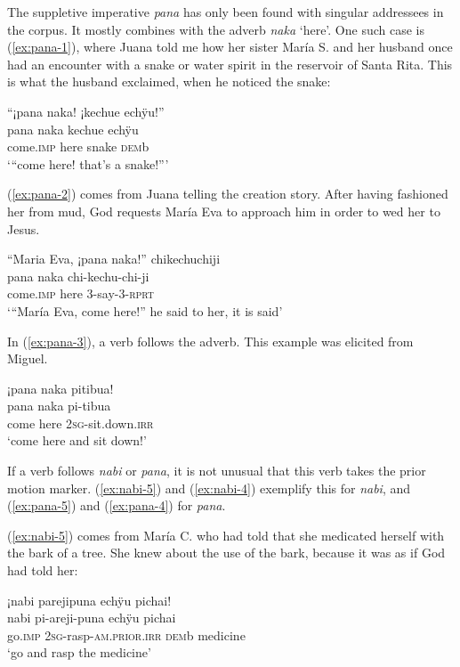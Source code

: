 The suppletive imperative \textit{pana} has only been found with singular addressees in the corpus. It mostly combines with the adverb \textit{naka} ‘here’. One such case is (\ref{ex:pana-1}), where Juana told me how her sister María S. and her husband once had an encounter with a snake or water spirit in the reservoir of Santa Rita. This is what the husband exclaimed, when he noticed the snake:

\ea\label{ex:pana-1}
\begingl
\glpreamble “¡pana naka! ¡kechue echÿu!”\\
\gla pana naka kechue echÿu\\
\glb come.\textsc{imp} here snake \textsc{dem}b\\
\glft ‘“come here! that’s a snake!”’
\endgl
\trailingcitation{[jxx-p120515l-2.164]}
\xe

(\ref{ex:pana-2}) comes from Juana telling the creation story. After having fashioned her from mud, God requests María Eva to approach him in order to wed her to Jesus.

\ea\label{ex:pana-2}
\begingl
\glpreamble “Maria Eva, ¡pana naka!” chikechuchiji\\
 pana naka chi-kechu-chi-ji\\
 come.\textsc{imp} here 3-say-3-\textsc{rprt}\\
\glft ‘“María Eva, come here!” he said to her, it is said’
\endgl
\trailingcitation{[jxx-n101013s-1.364]}
\xe

In (\ref{ex:pana-3}), a verb follows the adverb. This example was elicited from Miguel.

\ea\label{ex:pana-3}
\begingl
\glpreamble ¡pana naka pitibua!\\
\gla pana naka pi-tibua\\
\glb come here 2\textsc{sg}-sit.down.\textsc{irr}\\
\glft ‘come here and sit down!’
\endgl
\trailingcitation{[mxx-e160811sd.221]}
\xe


If a verb follows \textit{nabi} or \textit{pana}, it is not unusual that this verb takes the prior motion marker. (\ref{ex:nabi-5}) and (\ref{ex:nabi-4}) exemplify this for \textit{nabi}, and (\ref{ex:pana-5}) and (\ref{ex:pana-4}) for \textit{pana}.

(\ref{ex:nabi-5}) comes from María C. who had told that she medicated herself with the bark of a tree. She knew about the use of the bark, because it was as if God had told her:

\ea\label{ex:nabi-5}
\begingl
\glpreamble ¡nabi parejipuna echÿu pichai!\\
\gla nabi pi-areji-puna echÿu pichai \\
\glb go.\textsc{imp} 2\textsc{sg}-rasp-\textsc{am.prior.irr} \textsc{dem}b medicine\\
\glft ‘go and rasp the medicine’
\endgl
\trailingcitation{[ump-p110815sf.371]}
\xe

